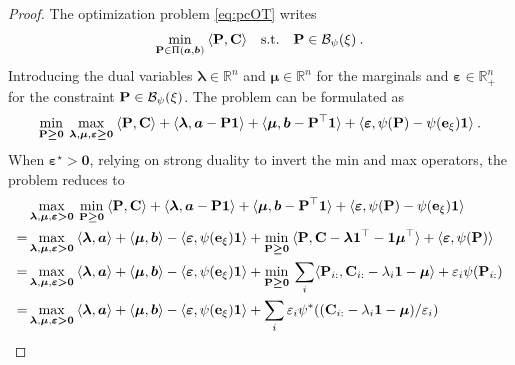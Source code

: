 \begin{proof}
The optimization problem \eqref{eq:pcOT} writes
\begin{align}
    \min_{{\mathbf{P}} \in \Pi(\bm{a}, \bm{b})} \: \langle {\mathbf{P}}, {\mathbf{C}} \rangle \quad \text{s.t.} \quad  {\mathbf{P}} \in \mathcal{B}_\psi(\xi) \:.
\end{align}
Introducing the dual variables $\bm{\lambda} \in \mathbb{R}^n$ and $\bm{\mu} \in \mathbb{R}^n$ for the marginals and $\bm{\varepsilon} \in \mathbb{R}_+^{n}$ for the constraint ${\mathbf{P}} \in \mathcal{B}_\psi(\xi)$. The problem can be formulated as
\begin{align}
    \min_{{\mathbf{P}} \bm{\geq} \bm{0}} \: \max_{\bm{\lambda}, \bm{\mu}, \bm{\varepsilon} \bm{\geq} \bm{0}} \: \langle {\mathbf{P}}, {\mathbf{C}} \rangle + \langle \bm{\lambda}, \bm{a} - {\mathbf{P}} \bm{1} \rangle + \langle \bm{\mu}, \bm{b} - {\mathbf{P}}^\top \bm{1} \rangle + \langle \bm{\varepsilon}, \psi({\mathbf{P}}) - \psi(\mathbf{e}_\xi) \bm{1} \rangle \:.
\end{align} 
When $\bm{\varepsilon}^\star \bm{>} \bm{0}$, relying on strong duality to invert the min and max operators, the problem reduces to
\begin{align}
    &\max_{\bm{\lambda}, \bm{\mu}, \bm{\varepsilon} \bm{>} \bm{0}} \: \min_{\mP \bm{\geq} \bm{0}} \: \langle \mP, \C \rangle + \langle \bm{\lambda}, \bm{a} - \mP \bm{1} \rangle + \langle \bm{\mu}, \bm{b} - \mP^\top \bm{1} \rangle + \langle \bm{\varepsilon}, \psi(\mP) - \psi(\mathbf{e}_\xi) \bm{1} \rangle \\
    = &\max_{\bm{\lambda}, \bm{\mu}, \bm{\varepsilon} \bm{>} \bm{0}} \: \langle \bm{\lambda}, \bm{a} \rangle + \langle \bm{\mu}, \bm{b} \rangle - \langle \bm{\varepsilon}, \psi(\mathbf{e}_\xi) \bm{1} \rangle + \min_{\mP \bm{\geq} \bm{0}} \: \langle \mP, \mC - \bm{\lambda}\bm{1}^\top - \bm{1}\bm{\mu}^\top \rangle + \langle \bm{\varepsilon}, \psi(\mP) \rangle \\
    = &\max_{\bm{\lambda}, \bm{\mu}, \bm{\varepsilon} \bm{>} \bm{0}} \: \langle \bm{\lambda}, \bm{a} \rangle + \langle \bm{\mu}, \bm{b} \rangle - \langle \bm{\varepsilon}, \psi(\mathbf{e}_\xi) \bm{1} \rangle + \min_{\mP \bm{\geq} \bm{0}} \: \sum_i \langle \mP_{i:}, \C_{i:} - \lambda_i \bm{1} - \bm{\mu} \rangle + \varepsilon_i \psi(\mP_{i:}) \\
    = &\max_{\bm{\lambda}, \bm{\mu}, \bm{\varepsilon} \bm{>} \bm{0}}  \: \langle \bm{\lambda}, \bm{a} \rangle + \langle \bm{\mu}, \bm{b} \rangle - \langle \bm{\varepsilon}, \psi(\mathbf{e}_\xi) \bm{1} \rangle + \sum_i \varepsilon_i \psi^*((\C_{i:} - \lambda_i \bm{1} - \bm{\mu}) / \varepsilon_i) \\

\end{align}
\end{proof}
